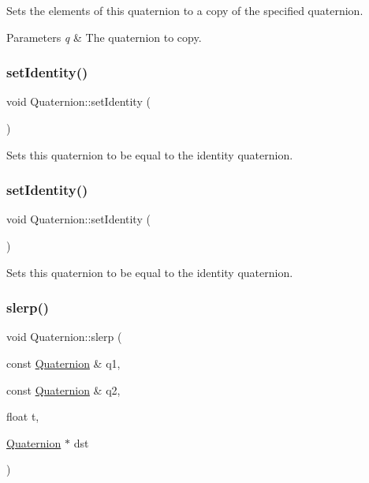Sets the elements of this quaternion to a copy of the specified quaternion.


\begin{DoxyParams}{Parameters}
{\em q} & The quaternion to copy. \\
\hline
\end{DoxyParams}
\mbox{\label{classQuaternion_af180a480b5595be969233e728fc4563e}} 
\subsubsection{\texorpdfstring{set\+Identity()}{setIdentity()}\hspace{0.1cm}{\footnotesize\ttfamily [1/2]}}
{\footnotesize\ttfamily void Quaternion\+::set\+Identity (\begin{DoxyParamCaption}{ }\end{DoxyParamCaption})}

Sets this quaternion to be equal to the identity quaternion. \mbox{\label{classQuaternion_af180a480b5595be969233e728fc4563e}} 
\subsubsection{\texorpdfstring{set\+Identity()}{setIdentity()}\hspace{0.1cm}{\footnotesize\ttfamily [2/2]}}
{\footnotesize\ttfamily void Quaternion\+::set\+Identity (\begin{DoxyParamCaption}{ }\end{DoxyParamCaption})}

Sets this quaternion to be equal to the identity quaternion. \mbox{\label{classQuaternion_a1f1bac1c3d55207b43cf6cc926c453af}} 
\subsubsection{\texorpdfstring{slerp()}{slerp()}\hspace{0.1cm}{\footnotesize\ttfamily [1/2]}}
{\footnotesize\ttfamily void Quaternion\+::slerp (\begin{DoxyParamCaption}\item[{const \hyperlink{classQuaternion}{Quaternion} \&}]{q1,  }\item[{const \hyperlink{classQuaternion}{Quaternion} \&}]{q2,  }\item[{float}]{t,  }\item[{\hyperlink{classQuaternion}{Quaternion} $\ast$}]{dst }\end{DoxyParamCaption})\hspace{0.3cm}{\ttfamily [static]}}

